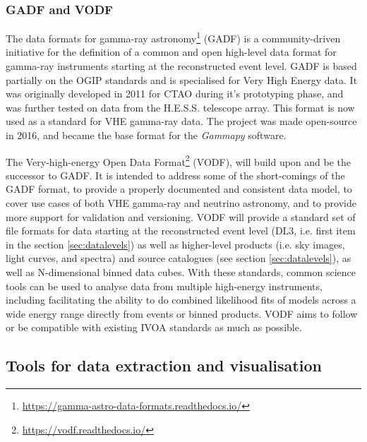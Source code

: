\documentclass[11pt,a4paper]{ivoa}
\begin{document}
{\subsubsection{GADF and VODF}
\label{sec:GADF}

The data formats for gamma-ray astronomy\footnote{\url{https://gamma-astro-data-formats.readthedocs.io/}} (GADF) is a community-driven initiative for the definition
of a common and open high-level data format for gamma-ray instruments \citep{2017AIPC.1792g0006D} starting at the
reconstructed event level. GADF is based partially on the OGIP standards and is specialised for Very High Energy data.
It was originally developed in 2011 for CTAO during it's prototyping phase, and was further tested on data from the
H.E.S.S. telescope array. This format is now used as a standard for VHE gamma-ray data. The project was made open-source
in 2016, and became the base format for the \emph{Gammapy} software.

The Very-high-energy Open Data Format\footnote{\url{https://vodf.readthedocs.io/}} (VODF), will build upon and be the successor to GADF. It is
intended to address some of the short-comings of the GADF format, to provide a properly documented and consistent data
model, to cover use cases of both VHE gamma-ray and neutrino astronomy, and to provide more support for validation and
versioning. VODF will provide a standard set of file formats for data starting at the reconstructed event level (DL3, i.e.
first item in the section \ref{sec:datalevels}) as well as higher-level products (i.e. sky images, light curves, and spectra)
and source catalogues (see section \ref{sec:datalevels}), as well as N-dimensional binned data cubes. With these
standards, common science tools can be used to analyse data from multiple high-energy instruments, including
facilitating the ability to do combined likelihood fits of models across a wide energy range directly from events or
binned products. VODF aims to follow or be compatible with existing IVOA standards as much as possible.

\subsection{Tools for data extraction and visualisation}
\label{sec:tools}

%
%
%
%

}
\end{document}
